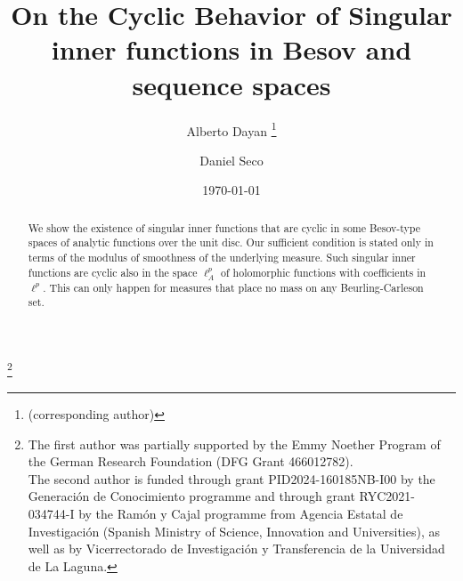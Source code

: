 \documentclass{birkjour}
\numberwithin{equation}{section}
\theoremstyle{plain}
\theoremstyle{definition}
\newcommand{\1}{\mathds{1}}
\begin{document}
\title[Cyclic and singular]{On the Cyclic Behavior of Singular inner functions in Besov and sequence spaces}
\author[Dayan]{Alberto Dayan \thanks{ (corresponding author)}}
\address{Departament de Matemàtiques \newline Universitat Autònoma de Barcelona  Bellaterra (Barcelona), Spain}

\author[Seco]{Daniel Seco }
\address{Departamento de An\'alisis Matem\'atico e IMAULL \newline Universidad de la Laguna \newline  Avenida Astrof\'isico Francisco S\'anchez, s/n.  \newline Facultad de Ciencias, secci\'on: Matem\'aticas, apdo. 456.   San Crist\'obal de La Laguna \newline
Santa Cruz de Tenerife,  Spain} 



\begin{abstract}
We show the existence of singular inner functions that are cyclic in some Besov-type spaces of analytic functions over the unit disc. Our sufficient condition is stated only in terms of the modulus of smoothness of the underlying measure. Such singular inner functions are cyclic also in the space $\ell^p_A$ of holomorphic functions with coefficients in $\ell^p$. This can only happen for measures that place no mass on any Beurling-Carleson set.
\end{abstract}

\thanks{The first author was partially supported by the Emmy Noether Program of the
German Research Foundation (DFG Grant 466012782).\\
The second author is funded through grant PID2024-160185NB-I00 by the Generaci\'on de Conocimiento programme and through grant RYC2021-034744-I by the Ram\'on y Cajal programme from Agencia Estatal de Investigaci\'on (Spanish Ministry of Science, Innovation and Universities), as well as by Vicerrectorado de Investigaci\'on y Transferencia de la Universidad de La Laguna.}





\date{\today}

\maketitle
\end{document}

